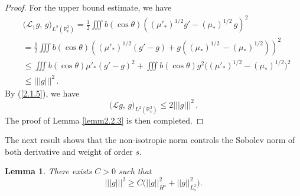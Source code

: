 \documentclass{amsart}[12pt, article]
\newtheorem{lemm}[theo]{Lemma}
\begin{document}
\begin{proof}
For the upper bound estimate, we have
\begin{align*}\label{2.2.11}
&\Big({{\mathcal L}}_1 g,\, g\Big)_{L^2({{{\mathbb R}}}^3_v)}= \frac 1 2 \iiint
b(\cos\theta) \left(
(\mu'_*)^{1/2} g' - (\mu_*)^{1/2}\, g \right)^2\nonumber\\
&= \frac 12 \iiint b(\cos\theta)  \left( (\mu'_*)^{1/2} (g' -g)+
g((\mu_*)^{1/2}\,-(\mu_*)^{1/2}) \right)^2\\
&\leq \iiint b(\cos\theta) \mu '_\ast (g'-g)^2+\iiint b(\cos\theta)
g^2 \Big((\mu'_*)^{1/2} -(\mu_*)^{1/2} \Big)^2\nonumber\\
&\leq ||| g|||^2\,\nonumber.
\end{align*}
By (\ref{2.1.5}), we have
\begin{equation*}\label{2.2.12}
\Big({{\mathcal L}} g,\, g\Big)_{L^2({{{\mathbb R}}}^3_v)}\leq 2||| g|||^2\,.
\end{equation*}
The proof of Lemma \ref{lemm2.2.3} is then completed.
\end{proof}
The next result shows that the non-isotropic norm controls the Sobolev norm of both derivative
 and  weight of order $s$.

\begin{lemm}\label{lemm2.2.4}
There exists $C>0$ such that
\begin{equation}\label{2.2.13}
||| g |||^2\ge C\big(|| g||^2_{H^s}+|| g||^2_{L^2_s}\big).
\end{equation}
\end{lemm}
\end{document}

